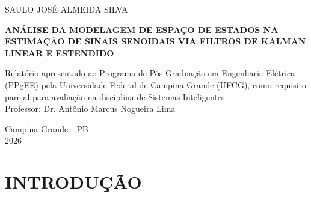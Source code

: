 \documentclass[a4paper,12pt]{article}
\newcommand{\startpagenumbering}{%
  \clearpage%
  \pagenumbering{arabic}%
  \setcounter{page}{1}%
  \pagestyle{standard}%
}
\begin{document}
	\begin{titlepage}
		\begin{center}
			
			\large{SAULO JOSÉ ALMEIDA SILVA}\\ 
			
			\vspace{100pt}
			
			\textbf{\MakeUppercase{Análise da Modelagem de Espaço de Estados na Estimação de Sinais Senoidais via Filtros de Kalman Linear e Estendido}}\\
			
		\end{center}
		
		\vspace{1,5cm}
		
		\begin{flushright}
			
			\begin{list}{}{
					\setlength{\leftmargin}{6.5cm}
					\setlength{\rightmargin}{0cm}
					\setlength{\labelwidth}{0pt}
					\setlength{\labelsep}{\leftmargin}}
				
				\item Relatório apresentado ao Programa de Pós-Graduação em Engenharia Elétrica (PPgEE) pela Universidade Federal de Campina Grande (UFCG), como requisito parcial para avaliação na disciplina de Sistemas Inteligentes \\
				\vspace{10pt}
				Professor: Dr. Antônio Marcus Nogueira Lima


			\end{list}
		\end{flushright}
		\vspace{1cm}
		\begin{center}
			\vspace{\fill}
			Campina Grande - PB\\
			2026
		\end{center}
	\end{titlepage}
	
	\newpage

    \newpage
    \tableofcontents
    \newpage
    \listoffigures         %
    \newpage
    \listoftables          %
    


    \newpage
	\startpagenumbering %

\section{INTRODUÇÃO}
\end{document}
